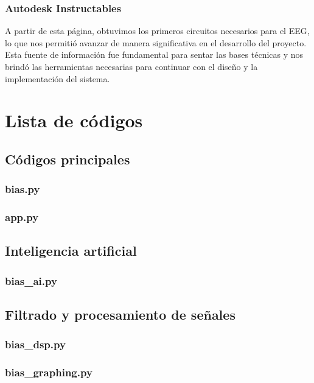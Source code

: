 \documentclass{article}
\begin{document}
\subsubsection{Autodesk Instructables}
A partir de esta página, obtuvimos los primeros circuitos necesarios para el EEG, lo que nos permitió avanzar de manera significativa en el desarrollo del proyecto. Esta fuente de información fue fundamental para sentar las bases técnicas y nos brindó las herramientas necesarias para continuar con el diseño y la implementación del sistema.


\section{Lista de códigos}

\subsection{Códigos principales}

\subsubsection{bias.py}

\subsubsection{app.py}

\subsection{Inteligencia artificial}

\subsubsection{bias_ai.py}

\subsection{Filtrado y procesamiento de señales}

\subsubsection{bias_dsp.py}

\subsubsection{bias_graphing.py} 
\end{document}
